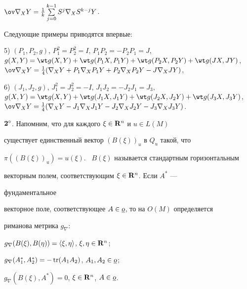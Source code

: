 $\ov\nabla_X Y=\frac{1}{k}\sum\limits^{k-1}_{j=0}S^j \nabla_X S^{k-j}Y$. 


 


Следующие примеры приводятся впервые: 


 


5) $(P_1,P_2,g)$, $P^2_1=P^2_2=I$, $P_1P_2=-P_2P_1=J$, $g(X,Y)=\wt 


g(X,Y)+\wt g(P_1X,P_1Y)+\wt g(P_2X,P_2Y)+\wt g(J X,J Y)$, $\ov\nabla_X 


Y=\frac{1}{4}(\nabla_X Y+P_1\nabla_X P_1Y+P_2 \nabla_X P_2Y-J \nabla_X J 


Y)$,


 


6) $(J_1,J_2,g)$, $J^2_1=J^2_2=-I$, $J_1J_2=-J_2J_1=J_3$, $g(X,Y)=\wt 


g(X,Y)+\wt g(J_1X,J_1Y)+\wt g(J_2X,J_2Y)+\wt g(J_3X,J_3Y)$, $\ov\nabla_X 


Y=\frac{1}{4}(\nabla_X Y-J_1\nabla_X J_1Y-J_2\nabla_X J_2Y-J_3\nabla_X 


J_3Y)$. 


\medskip 


 


$\bold 2^\circ$. Напомним, что для каждого $\xi\in\bold R^n$ и $u\in L(M)$ 


существует единственный вектор $(B(\xi))_u$ в $Q_u$ такой, что 


$\pi((B(\xi))_u)=u(\xi)$. \ $B(\xi)$ называется стандартным горизонтальным 


векторным полем, соответствующим $\xi\in\bold R^n$. Если $A^*$ --- 


фундаментальное 


векторное поле, соответствующее $A\in\underline o$, то на $O(M)$ определяется 


риманова метрика $g_\nabla$: 


 


$g_\nabla(B(\xi),B(\eta))=\langle\xi,\eta\rangle$, $\xi,\eta\in\bold R^n$; 


 


$g_\nabla(A^*_1,A^*_2)=-\operatorname{tr}(A_1A_2)$, $A_1,A_2\in\underline o$; 


 


$g_\nabla(B(\xi),A^*)=0$, $\xi\in\bold R^n$, $A\in\underline o$. 



